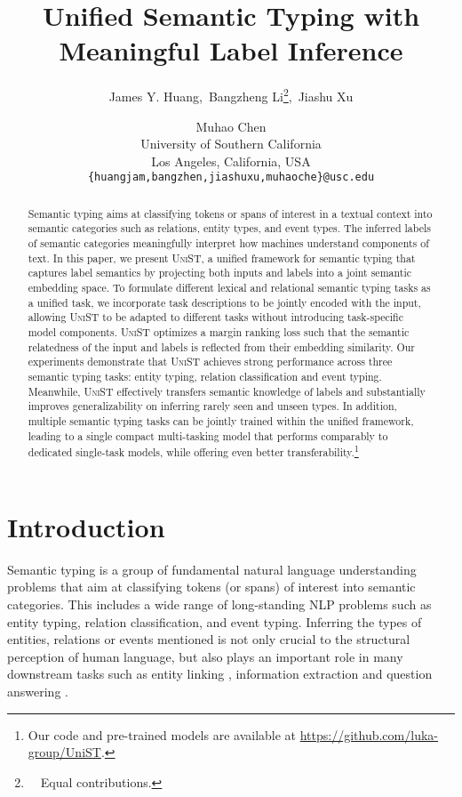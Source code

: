 \documentclass[11pt]{article}
\title{Unified Semantic Typing with Meaningful Label Inference}
\author{James Y. Huang,\;~Bangzheng Li\thanks{~~Equal contributions.},\;~Jiashu Xu\footnotemark[1] \and Muhao Chen \\
  University of Southern California \\
   Los Angeles, California, USA \\
  \texttt{\{huangjam,bangzhen,jiashuxu,muhaoche\}@usc.edu} 
  }
\newcommand{\model}{\textsc{UniST}\xspace}
\begin{document}
\maketitle
\begin{abstract}

Semantic typing aims at classifying tokens or spans of interest in a textual context into semantic categories such as relations, entity types, and event types. The inferred labels of semantic categories meaningfully interpret how machines understand components of text. In this paper, we present \model, a unified framework for semantic typing that captures label semantics by projecting both inputs and labels into a joint semantic embedding space. To formulate different lexical and relational semantic typing tasks as a unified task, we incorporate task descriptions to be jointly encoded with the input, allowing \model to be adapted to different tasks without introducing task-specific model components. \model optimizes a margin ranking loss such that the semantic relatedness of the input and labels is reflected from their embedding similarity. Our experiments demonstrate that \model achieves strong performance across three semantic typing tasks: entity typing, relation classification and event typing. Meanwhile, \model effectively transfers semantic knowledge of labels and substantially improves generalizability on inferring rarely seen and unseen types. In addition, multiple semantic typing tasks can be jointly trained within the unified framework, leading to a single compact multi-tasking model that performs comparably to dedicated single-task models, while offering even better transferability.\footnote{Our code and pre-trained models are available at \url{https://github.com/luka-group/UniST}.} 
\end{abstract}

\section{Introduction}



Semantic typing is a group of fundamental natural language understanding problems that aim at classifying tokens (or spans) of interest into semantic categories. This includes a wide range of long-standing NLP problems such as entity typing, relation classification, and event typing. Inferring the types of entities, relations or events mentioned is not only crucial to the structural perception of human language, but also plays an important role in many downstream tasks such as entity linking \cite{onoe-durrett-2020-interpretable}, information extraction \cite{zhong-chen-2021-frustratingly} and question answering \cite{yavuz-etal-2016-improving}. 
\end{document}
